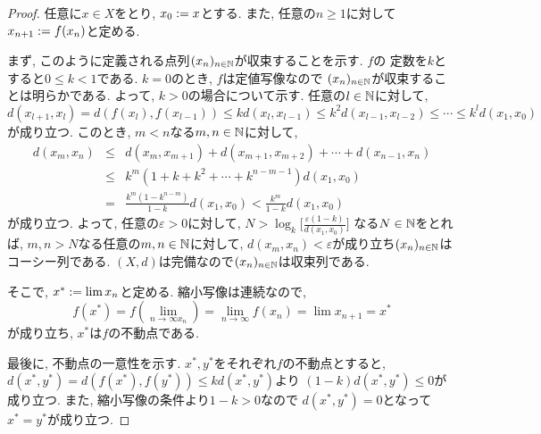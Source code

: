 \documentclass[uplatex, dvipdfmx, a4paper, 12pt, class=jsbook, crop=false]{standalone}
\begin{document}
\begin{proof}
	任意に$ x \in X $をとり, $ x_0 \mathrel{:=} x $とする.
	また, 任意の$ n \geq 1 $に対して$ x_{n+1} \mathrel{:=} f(x_n) $と定める.

	まず, このように定義される点列$ (x_n)_{n \in \mathbb{N}} $が収束することを示す.
	$ f $の \Lipschitz 定数を$ k $とすると$ 0 \leq k < 1 $である.
	$ k = 0 $のとき, $ f $は定値写像なので
	$ (x_n)_{n \in \mathbb{N}} $が収束することは明らかである.
	よって, $ k > 0 $の場合について示す.
	任意の$ l \in \mathbb{N} $に対して,
	\[ d(x_{l+1}, x_l) = d(f(x_l), f(x_{l-1}))
	\leq kd(x_l, x_{l-1}) \leq k^2d(x_{l-1}, x_{l-2}) \leq \cdots \leq k^ld(x_1,x_0)\]
	が成り立つ. このとき, $ m < n $なる$ m, n \in \mathbb{N} $に対して,
	\begin{eqnarray*}
		d(x_m, x_n) & \leq & d(x_m, x_{m+1}) + d(x_{m+1}, x_{m+2}) + \cdots + d(x_{n-1}, x_n) \\
		            & \leq & k^m(1 + k + k^2 + \cdots + k^{n-m-1})d(x_1, x_0) \\
					& = & \frac{k^m(1-k^{n-m})}{1-k}d(x_1, x_0) < \frac{k^m}{1-k}d(x_1, x_0)
	\end{eqnarray*}
	が成り立つ. よって, 任意の$ \varepsilon > 0 $に対して,
	$ N > \log_k \lbrack \frac{\varepsilon (1-k)}{d(x_1, x_0)}  \rbrack $
	なる$ N \in \mathbb{N} $をとれば, $ m, n > N $なる任意の$ m, n \in \mathbb{N} $に対して,
	$ d(x_m, x_n) < \varepsilon $が成り立ち$ (x_n)_{n \in \mathbb{N}} $はコーシー列である.
	$ (X, d) $は完備なので$ (x_n)_{n \in \mathbb{N}} $は収束列である.

	そこで, $ x^* \mathrel{:=} \lim x_n $と定める. 縮小写像は連続なので,
	\[ f(x^*) = f(\lim_{n \to \infty x_n})
	= \lim_{n \to \infty} f(x_n) = \lim x_{n+1} = x^*\]
	が成り立ち, $ x^* $は$ f $の不動点である.

	最後に, 不動点の一意性を示す.
	$ x^*, y^* $をそれぞれ$ f $の不動点とすると,
	$ d(x^*, y^*) = d(f(x^*), f(y^*)) \leq kd(x^*, y^*) $より
	$ (1-k)d(x^*, y^*) \leq 0 $が成り立つ.
	また, 縮小写像の条件より$ 1 - k > 0 $なので
	$ d(x^*, y^*) = 0 $となって$ x^* = y^* $が成り立つ.
\end{proof}
\end{document}

